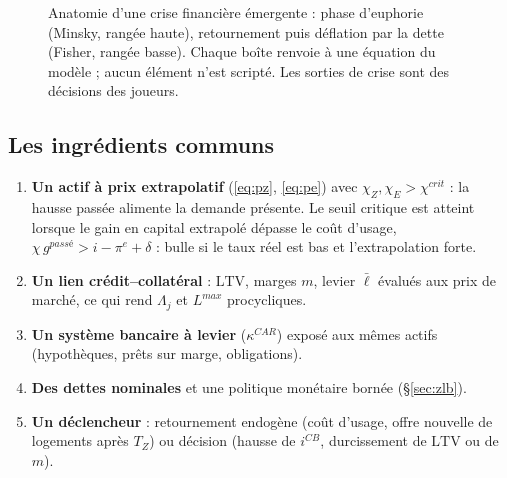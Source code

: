 \documentclass[11pt,a4paper]{article}
\begin{document}
\begin{figure}[htbp]
{}
\caption{Anatomie d'une crise financière émergente : phase d'euphorie (Minsky, rangée haute), retournement puis déflation par la dette (Fisher, rangée basse). Chaque boîte renvoie à une équation du modèle ; aucun élément n'est scripté. Les sorties de crise sont des décisions des joueurs.}
\label{fig:crise}
\end{figure}


\subsection{Les ingrédients communs}
\begin{enumerate}
\item \textbf{Un actif à prix extrapolatif} (\eqref{eq:pz}, \eqref{eq:pe}) avec $\chi_Z, \chi_E > \chi^{crit}$ : la hausse passée alimente la demande présente. Le seuil critique est atteint lorsque le gain en capital extrapolé dépasse le coût d'usage, $\chi\, g^{passé} > i - \pi^e + \delta$ : bulle si le taux réel est bas et l'extrapolation forte.
\item \textbf{Un lien crédit--collatéral} : $\mathrm{LTV}$, marges $m$, levier $\bar\ell$ évalués aux prix de marché, ce qui rend $\Lambda_j$ et $L^{max}$ procycliques.
\item \textbf{Un système bancaire à levier} ($\kappa^{CAR}$) exposé aux mêmes actifs (hypothèques, prêts sur marge, obligations).
\item \textbf{Des dettes nominales} et une politique monétaire bornée (\S\ref{sec:zlb}).
\item \textbf{Un déclencheur} : retournement endogène (coût d'usage, offre nouvelle de logements après $T_Z$) ou décision (hausse de $i^{CB}$, durcissement de $\mathrm{LTV}$ ou de $m$).
\end{enumerate}
\end{document}

